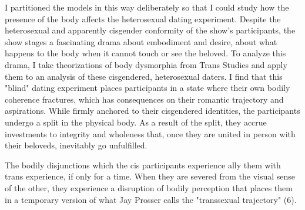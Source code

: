 \documentclass[11pt]{article}
\begin{document}
I partitioned the models in this way deliberately so that I could
study how the presence of the body affects the heterosexual dating
experiment. Despite the heterosexual and apparently cisgender
conformity of the show's participants, the show stages a fascinating
drama about embodiment and desire, about what happens to the body when
it cannot touch or see the beloved. To analyze this drama, I take
theorizations of body dysmorphia from Trans Studies and apply them to
an analysis of these cisgendered, heterosexual daters. I find that
this "blind" dating experiment places participants in a state where
their own bodily coherence fractures, which has consequences on their
romantic trajectory and aspirations. While firmly anchored to their
cisgendered identities, the participants undergo a split in the
physical body. As a result of the split, they accrue investments to
integrity and wholeness that, once they are united in person with
their beloveds, inevitably go unfulfilled.

The bodily disjunctions which the cis participants experience ally
them with trans experience, if only for a time. When they are severed
from the visual sense of the other, they experience a disruption of
bodily perception that places them in a temporary version of what Jay
Prosser calls the "transsexual trajectory" (6).
\end{document}

